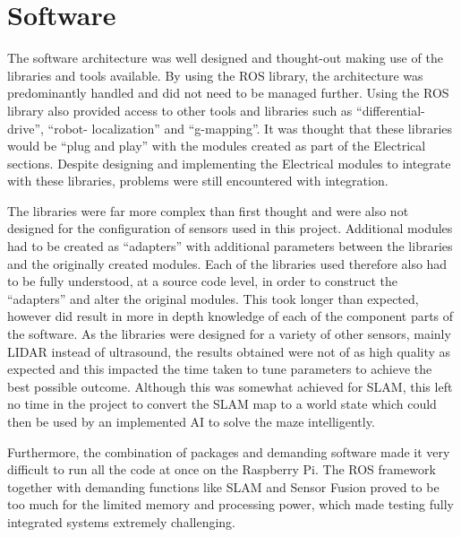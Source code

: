 \section{Software}\label{eval/soft}
The software architecture was well designed and thought-out making use of the 
libraries and tools available. By using the ROS library, the architecture was predominantly handled
and did not need to be managed further. Using the ROS library also provided 
access to other tools and libraries such as ``differential-drive'', ``robot-
localization'' and ``g-mapping''. It was thought that these libraries would be ``plug 
and play'' with the modules created as part of the Electrical sections. Despite  
designing and implementing the Electrical modules to integrate with these libraries, 
problems were still encountered with integration. 

The libraries were far more complex than first thought and were also not designed for 
the configuration of sensors used in this project. Additional modules had to be 
created as ``adapters'' with additional parameters between the libraries and the 
originally created modules. Each of the libraries used therefore also had to be fully 
understood, at a source code level, in order to construct the ``adapters'' and alter 
the original modules. This took longer than expected, however did result in more in 
depth knowledge of each of the component parts of the software. As the libraries were 
designed for a variety of other sensors, mainly LIDAR instead of ultrasound, the 
results obtained were not of as high quality as expected and this impacted the time 
taken to tune parameters to achieve the best possible outcome. Although this was 
somewhat achieved for SLAM, this left no time in the project to convert the SLAM map 
to a world state which could then be used by an implemented AI to solve the maze 
intelligently. 

Furthermore, the combination of packages and demanding software made it very difficult to run all the code at once on the Raspberry Pi. The ROS framework together with demanding functions like SLAM and Sensor Fusion proved to be too much for the limited memory and processing power, which made testing fully integrated systems extremely challenging.


